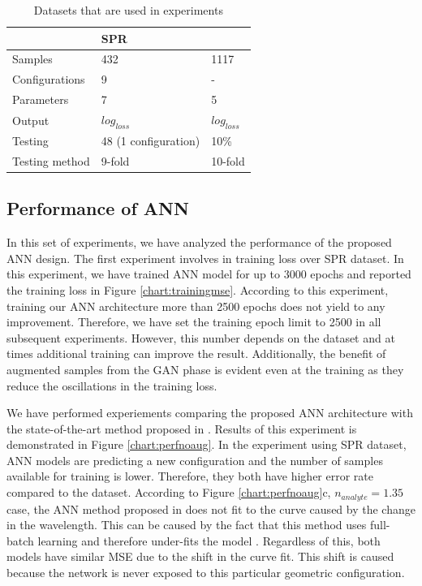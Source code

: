 \documentclass[10pt]{IEEEtran}
\begin{document}
\begin{table}
\centering
\caption{Datasets that are used in experiments}
\begin{tabular}{l|l|l}
	~ & SPR & \dszero \\\hline
	Samples & 432 & 1117\\
	Configurations & 9 & - \\
	Parameters & 7 & 5 \\
	Output & $log_{loss}$ & $log_{loss}$ \\
	Testing & 48 (1 configuration) & 10\% \\
	Testing method & 9-fold & 10-fold \\
\end{tabular}
\label{tbl:dataset}
\end{table}


\subsection{Performance of ANN}

In this set of experiments, we have analyzed the performance of the proposed ANN design. The first experiment involves in training loss over SPR dataset. In this experiment, we have trained ANN model for up to 3000 epochs and reported the training loss in Figure \ref{chart:trainingmse}. According to this experiment, training our ANN architecture more than 2500 epochs does not yield to any improvement. Therefore, we have set the training epoch limit to 2500 in all subsequent experiments. However, this number depends on the dataset and at times additional training can improve the result. Additionally, the benefit of augmented samples from the GAN phase is evident even at the training as they reduce the oscillations in the training loss.

We have performed experiements comparing the proposed ANN architecture with the state-of-the-art method proposed in \cite{paper0}. Results of this experiment is demonstrated in Figure \ref{chart:perfnoaug}. In the experiment using SPR dataset, ANN models are predicting a new configuration and the number of samples available for training is lower. Therefore, they both have higher error rate compared to the \dszero{} dataset. According to Figure \ref{chart:perfnoaug}c, $n_{analyte} = 1.35$ case, the ANN method proposed in \cite{paper0} does not fit to the curve caused by the change in the wavelength. This can be caused by the fact that this method uses full-batch learning and therefore under-fits the model \cite{keskar2016large}. Regardless of this, both models have similar MSE due to the shift in the curve fit. This shift is caused because the network is never exposed to this particular geometric configuration. 
\end{document}
